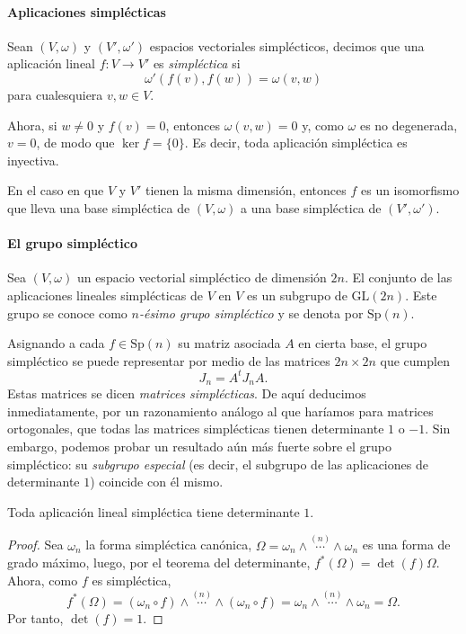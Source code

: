 \paragraph{\bf Aplicaciones simplécticas}\mbox{}

  Sean $(V,\omega)$ y $(V',\omega')$ espacios vectoriales simplécticos, decimos que una aplicación lineal $f:V \rightarrow V'$ es \emph{simpléctica} si
  \[
    \omega'(f(v),f(w)) = \omega(v,w)
  \]
  para cualesquiera $v,w \in V$.

Ahora, si $w\neq 0$ y $f(v)=0$, entonces $\omega(v,w)=0$ y, como $\omega$ es no degenerada, $v=0$, de modo que $\ker f=\{0\}$. Es decir, toda aplicación simpléctica es inyectiva.

En el caso en que $V$ y $V'$ tienen la misma dimensión, entonces $f$ es un isomorfismo que lleva una base simpléctica de $(V,\omega)$ a una base simpléctica de $(V',\omega')$. 

\paragraph{\bf El grupo simpléctico}\mbox{}

  Sea $(V,\omega)$ un espacio vectorial simpléctico de dimensión $2n$. El conjunto de las aplicaciones lineales simplécticas de $V$ en $V$ es un subgrupo de $\mathrm{GL}(2n)$. Este grupo se conoce como \emph{$n$-ésimo grupo simpléctico} y se denota por $\mathrm{Sp}(n)$.

  Asignando a cada $f\in \mathrm{Sp}(n)$ su matriz asociada $A$ en cierta base, el grupo simpléctico se puede representar por medio de las matrices $2n\times 2n$ que cumplen
  \begin{equation*}
    J_n=A^tJ_n A.
  \end{equation*}
  Estas matrices se dicen \emph{matrices simplécticas}.
  De aquí deducimos inmediatamente, por un razonamiento análogo al que haríamos para matrices ortogonales, que todas las matrices simplécticas tienen determinante $1$ o $-1$. Sin embargo, podemos probar un resultado aún más fuerte sobre el grupo simpléctico: su \emph{subgrupo especial} (es decir, el subgrupo de las aplicaciones de determinante $1$) coincide con él mismo.
\begin{prop}
  Toda aplicación lineal simpléctica tiene determinante $1$.
\end{prop}
\begin{proof}
  Sea $\omega_n$ la forma simpléctica canónica, $\Omega=\omega_n \wedge \overset{(n)}{\cdots} \wedge \omega_n$ es una forma de grado máximo, luego, por el teorema del determinante, $f^*(\Omega)=\det(f) \Omega$. Ahora, como $f$ es simpléctica, 
  \begin{equation*}
    f^*(\Omega) = (\omega_n \circ f) \wedge \overset{(n)}{\cdots} \wedge (\omega_n \circ f)=\omega_n \wedge \overset{(n)}{\cdots} \wedge \omega_n = \Omega.
  \end{equation*}
  Por tanto, $\det(f)=1$.
\end{proof}
